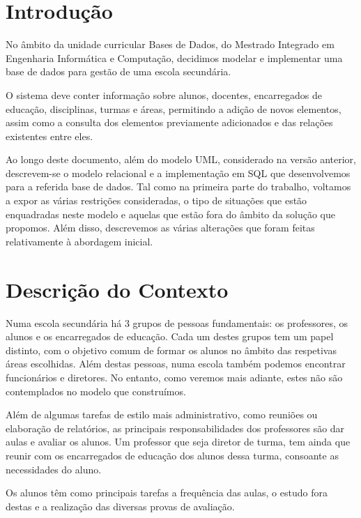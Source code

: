 \documentclass[12pt,a4paper,reqno]{report}
\numberwithin{figure}{section}
\numberwithin{equation}{section}
\begin{document}


\tableofcontents

\chapter{Introdução}

No âmbito da unidade curricular Bases de Dados, do Mestrado Integrado em Engenharia Informática e Computação, decidimos modelar e implementar uma base de dados para gestão de uma escola secundária.

O sistema deve conter informação sobre alunos, docentes, encarregados de educação, disciplinas, turmas e áreas, permitindo a adição de novos elementos, assim como a consulta dos elementos previamente adicionados e das relações existentes entre eles.

Ao longo deste documento, além do modelo UML, considerado na versão anterior, descrevem-se o modelo relacional e a implementação em SQL que desenvolvemos para a referida base de dados. Tal como na primeira parte do trabalho, voltamos a expor as várias restrições consideradas, o tipo de situações que estão enquadradas neste modelo e aquelas que estão fora do âmbito da solução que propomos. Além disso, descrevemos as várias alterações que foram feitas relativamente à abordagem inicial.

\chapter{Descrição do Contexto}

Numa escola secundária há 3 grupos de pessoas fundamentais: os professores, os alunos e os encarregados de educação. Cada um destes grupos tem um papel distinto, com o objetivo comum de formar os alunos no âmbito das respetivas áreas escolhidas. Além destas pessoas, numa escola também podemos encontrar funcionários e diretores. No entanto, como veremos mais adiante, estes não são contemplados no modelo que construímos.

Além de algumas tarefas de estilo mais administrativo, como reuniões ou elaboração de relatórios, as principais responsabilidades dos professores são dar aulas e avaliar os alunos. Um professor que seja diretor de turma, tem ainda que reunir com os encarregados de educação dos alunos dessa turma, consoante as necessidades do aluno.

Os alunos têm como principais tarefas a frequência das aulas, o estudo fora destas e a realização das diversas provas de avaliação.
\end{document}
